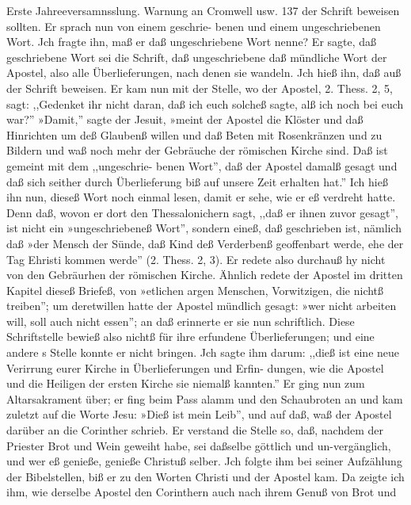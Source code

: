 Erste Jahreeversamnsslung. Warnung an Cromwell usw. 137
der Schrift beweisen sollten. Er sprach nun von einem geschrie-
benen und einem ungeschriebenen Wort. Jch fragte ihn, maß er
daß ungeschriebene Wort nenne? Er sagte, daß geschriebene
Wort sei die Schrift, daß ungeschriebene daß mündliche Wort der
Apostel, also alle Überlieferungen, nach denen sie wandeln. Jch
hieß ihn, daß auß der Schrift beweisen. Er kam nun mit der
Stelle, wo der Apostel, 2. Thess. 2, 5, sagt: ,,Gedenket ihr nicht
daran, daß ich euch solcheß sagte, alß ich noch bei euch war?''
»Damit,'' sagte der Jesuit, »meint der Apostel die Klöster und
daß Hinrichten um deß Glaubenß willen und daß Beten mit
Rosenkränzen und zu Bildern und waß noch mehr der Gebräuche
der römischen Kirche sind. Daß ist gemeint mit dem ,,ungeschrie-
benen Wort'', daß der Apostel damalß gesagt und daß sich seither
durch Überlieferung biß auf unsere Zeit erhalten hat.'' Ich hieß
ihn nun, dieseß Wort noch einmal lesen, damit er sehe, wie er eß
verdreht hatte. Denn daß, wovon er dort den Thessalonichern
sagt, ,,daß er ihnen zuvor gesagt'', ist nicht ein »ungeschriebeneß
Wort'', sondern eineß, daß geschrieben ist, nämlich daß »der Mensch
der Sünde, daß Kind deß Verderbenß geoffenbart werde, ehe der Tag
Ehristi kommen werde'' (2. Thess. 2, 3). Er redete also durchauß
hy nicht von den Gebräurhen der römischen Kirche. Ähnlich redete
  der Apostel im dritten Kapitel dieseß Briefeß, von »etlichen argen
Menschen, Vorwitzigen, die nichtß treiben''; um deretwillen hatte
der Apostel mündlich gesagt: »wer nicht arbeiten will, soll auch nicht
essen''; an daß erinnerte er sie nun schriftlich. Diese Schriftstelle
bewieß also nichtß für ihre erfundene Überlieferungen; und eine andere s
Stelle konnte er nicht bringen. Jch sagte ihm darum: ,,dieß ist
eine neue Verirrung eurer Kirche in Überlieferungen und Erfin-
dungen, wie die Apostel und die Heiligen der ersten Kirche sie
niemalß kannten.''
Er ging nun zum Altarsakrament über; er fing beim Pass alamm
und den Schaubroten an und kam zuletzt auf die Worte Jesu:
»Dieß ist mein Leib'', und auf daß, waß der Apostel darüber an
die Corinther schrieb. Er verstand die Stelle so, daß, nachdem der
Priester Brot und Wein geweiht habe, sei daßselbe göttlich und
un-vergänglich, und wer eß genieße, genieße Christuß selber. Jch
folgte ihm bei seiner Aufzählung der Bibelstellen, biß er zu den
Worten Christi und der Apostel kam. Da zeigte ich ihm, wie
derselbe Apostel den Corinthern auch nach ihrem Genuß von Brot und


